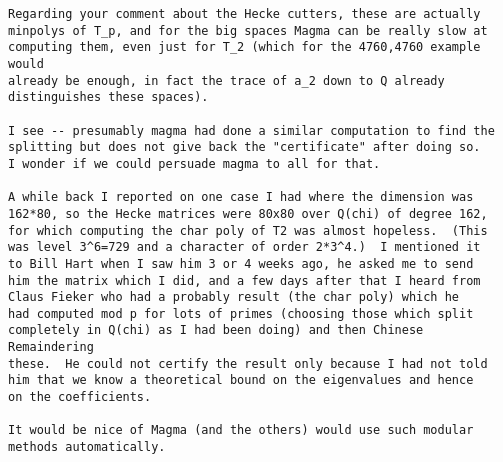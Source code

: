 \documentclass[11pt]{amsart}
\numberwithin{equation}{subsection}
\theoremstyle{plain}
\theoremstyle{definition}
\begin{document}
\begin{verbatim}
Regarding your comment about the Hecke cutters, these are actually 
minpolys of T_p, and for the big spaces Magma can be really slow at 
computing them, even just for T_2 (which for the 4760,4760 example would 
already be enough, in fact the trace of a_2 down to Q already 
distinguishes these spaces).

I see -- presumably magma had done a similar computation to find the 
splitting but does not give back the "certificate" after doing so.  
I wonder if we could persuade magma to all for that.

A while back I reported on one case I had where the dimension was 
162*80, so the Hecke matrices were 80x80 over Q(chi) of degree 162, 
for which computing the char poly of T2 was almost hopeless.  (This 
was level 3^6=729 and a character of order 2*3^4.)  I mentioned it 
to Bill Hart when I saw him 3 or 4 weeks ago, he asked me to send 
him the matrix which I did, and a few days after that I heard from 
Claus Fieker who had a probably result (the char poly) which he 
had computed mod p for lots of primes (choosing those which split 
completely in Q(chi) as I had been doing) and then Chinese Remaindering 
these.  He could not certify the result only because I had not told 
him that we know a theoretical bound on the eigenvalues and hence 
on the coefficients.

It would be nice of Magma (and the others) would use such modular 
methods automatically.
\end{verbatim}
\end{document}
